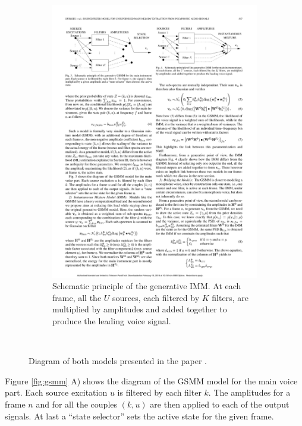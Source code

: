 \begin{figure}
\begin{subfigure}[b]{0.47\textwidth}
                \includegraphics[width=\textwidth]{Figures/imm}
                \caption{Schematic principle of the generative IMM. At each frame, all the $U$ sources, each filtered by $K$ filters, are multiplied by amplitudes and added together to produce the leading voice signal.}
                \label{fig:imm}
        \end{subfigure}
          \caption{Diagram of both models presented in the paper \cite{durrieu}.}
        ~ %
        \label{fig:gsmmimm}
\end{figure}

Figure \ref{fig:gsmm}  A) shows the diagram of the GSMM model for the main voice part. Each source excitation $u$ is filtered by each filter $k$. The amplitudes for a frame $n$ and for all the couples $(k, u)$ are then applied to each of the output signals. At last a ``state selector'' sets the active state for the given frame.

